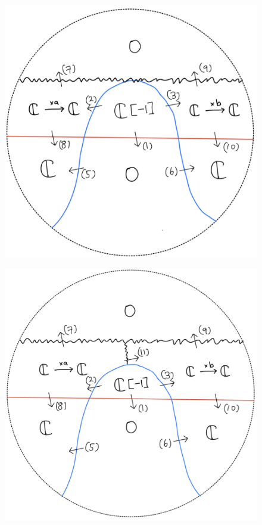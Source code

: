 \begin{figure}[H]
    \centering
    \includegraphics[scale = 0.45]{diagrams/lemma2/41.png} 
    \caption{}
    \label{fig:your-label}
\end{figure}
\begin{figure}[H]
    \centering
    \includegraphics[scale = 0.45]{diagrams/lemma2/42.png} 
    \caption{}
    \label{fig:your-label}
\end{figure}
